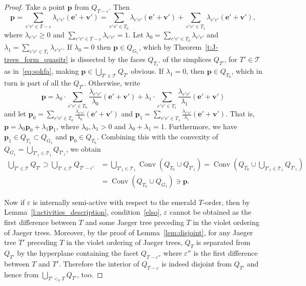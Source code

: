 \documentclass[10pt]{amsart}
\theoremstyle{definition}\newtheorem{defi}[theo]{Definition}
\theoremstyle{remark}\newtheorem{rema}[theo]{Remark}
\DeclareMathOperator{\conv}{Conv}
\begin{document}
\begin{proof}
Take a point $\mathbf p$ from $Q_{T - \varepsilon}$. Then 
\[\mathbf p=\sum_{e'v'\in T - \varepsilon}\lambda_{e'v'} (\mathbf{e'}+\mathbf{v'})=\sum_{e'v'\in T_0}\lambda_{e'v'} (\mathbf{e'}+\mathbf{v'}) + \sum_{e'v'\in T_1}\lambda_{e'v'} (\mathbf{e'}+\mathbf{v'}),\]
where $\lambda_{e'v'}\geq 0$ and $\sum_{e'v'\in T - \varepsilon}\lambda_{e'v'}=1$. Let $\lambda_0=\sum_{e'v'\in T_0}\lambda_{e'v'}$ and $\lambda_1=\sum_{e'v'\in T_1}\lambda_{e'v'}$. If $\lambda_0=0$ then $\mathbf p\in Q_{G_1}$, which by Theorem~\ref{t:J-trees_form_quasitr} is dissected by the faces $Q_{T_1'}$ of the simplices $Q_{T'}$, for $T'\in\mathcal T$ as in~\eqref{eq:sokfa}, making $\mathbf p\in \bigcup_{T'\in \mathcal{T}}Q_{T'}$ obvious. If $\lambda_1=0$, then $\mathbf p\in Q_{T_0}$, which in turn is part of all the $Q_{T'}$. Otherwise, write
\[\mathbf p=\lambda_0\cdot\sum_{e'v'\in T_0}\frac{\lambda_{e'v'}}{\lambda_0} (\mathbf{e'}+\mathbf{v'}) + \lambda_1\cdot \sum_{e'v'\in T_1}\frac{\lambda_{e'v'}}{\lambda_1} (\mathbf{e'}+\mathbf{v'})\]
and let $\mathbf p_0=\sum_{e'v'\in T_0}\frac{\lambda_{e'v'}}{\lambda_0} (\mathbf{e'}+\mathbf{v'})$ and $\mathbf p_1=\sum_{e'v'\in T_1}\frac{\lambda_{e'v'}}{\lambda_1} (\mathbf{e'}+\mathbf{v'})$. That is, $\mathbf p=\lambda_0\mathbf p_0 + \lambda_1\mathbf p_1$, where $\lambda_0,\lambda_1>0$ and $\lambda_0 + \lambda_1=1$. Furthermore, we have $\mathbf p_1\in Q_{T_1}\subset Q_{G_1}$ and $\mathbf p_0\in Q_{T_0}$. Combining this with the convexity of $Q_{G_1}=\bigcup_{T'_1\in \mathcal{T}_1}Q_{T'_1}$, we obtain
\begin{align*}
\bigcup_{T'\in \mathcal{T}}Q_{T'}\supset \bigcup_{T'\in \mathcal{T}}Q_{T'-\varepsilon'}&=\bigcup_{T'_1\in \mathcal{T}_1} \conv(Q_{T_0}\cup Q_{T'_1})=\conv\left(Q_{T_0}\cup\bigcup_{T'_1\in \mathcal{T}_1}Q_{T'_1}\right)\\
&=\conv(Q_{T_0} \cup Q_{G_1})\ni \mathbf p.
\end{align*}

Now if $\varepsilon$ is internally semi-active with respect to the emerald $T$-order, then by Lemma~\ref{l:activities_description}, condition~\ref{elso}, $\varepsilon$ cannot be obtained as the first difference between $T$ and some Jaeger tree preceding $T$ in the violet ordering of Jaeger trees. Moreover, by the proof of Lemma~\ref{lem:disjoint}, for any Jaeger tree $T'$ preceding $T$ in the violet ordering of Jaeger trees, $Q_{T}$ is separated from $Q_{T'}$ by the hyperplane containing the facet $Q_{T - \varepsilon''}$ where $\varepsilon''$ is the first difference between $T$ and $T'$. Therefore the interior of $Q_{T - \varepsilon}$ is indeed disjoint from $Q_{T'}$ and hence from $\bigcup_{T'<_V T}Q_{T'}$, too. 
\end{proof}
\end{document}
